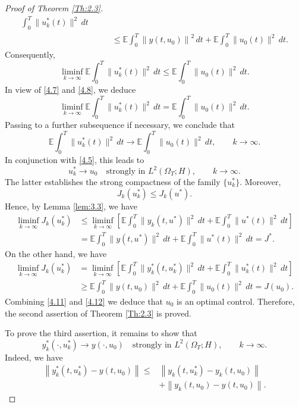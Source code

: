 \documentclass[a4paper,12pt]{article}
\numberwithin{equation}{section}
\begin{document}
\begin{proof}[Proof of Theorem \ref{Th:2.3}]
\[\begin{aligned}
\int_0^T
\|u_k^*(t)\|^2\,dt
\\
&\qquad\leq
\mathbb{E}
\int_0^T
\left\|
y(t,u_0)
\right\|^2\,dt
+
\mathbb{E}
\int_0^T
\|u_0(t)\|^2\,dt.
\end{aligned}
\]
Consequently,
\begin{equation}
\liminf_{k\to\infty}
\mathbb{E}
\int_0^T
\|u_k^*(t)\|^2\,dt
\leq
\mathbb{E}
\int_0^T
\|u_0(t)\|^2\,dt.
\label{4.8}
\end{equation}
In view of \eqref{4.7} and \eqref{4.8}, we deduce
\[
\liminf_{k\to\infty}
\mathbb{E}
\int_0^T
\|u_k^*(t)\|^2\,dt
=
\mathbb{E}
\int_0^T
\|u_0(t)\|^2\,dt.
\]
Passing to a further subsequence if necessary, we conclude that
\begin{equation}
\mathbb{E}
\int_0^T
\|u_k^*(t)\|^2\,dt
\to
\mathbb{E}
\int_0^T
\|u_0(t)\|^2\,dt,
\qquad k\to\infty.
\label{4.9}
\end{equation}
In conjunction with \eqref{4.5}, this leads to
\begin{equation}
u_k^*
\longrightarrow
u_0
\quad\text{strongly in }L^2(\Omega_T;H),
\qquad k\to\infty.
\label{4.10}
\end{equation}
The latter establishes the strong compactness of the family
$\{u_k^*\}$. Moreover,
\[
J_k(u_k^*)
\leq
J_k(u^*).
\]
Hence, by Lemma \ref{lem:3.3}, we have
\begin{align}
\liminf_{k\to\infty}J_k(u_k^*)
&\leq
\liminf_{k\to\infty}
\left[
\mathbb{E}\int_0^T
\|y_k(t,u^*)\|^2\,dt
+
\mathbb{E}\int_0^T
\|u^*(t)\|^2\,dt
\right]
\nonumber\\
&=
\mathbb{E}\int_0^T
\|y(t,u^*)\|^2\,dt
+
\mathbb{E}\int_0^T
\|u^*(t)\|^2\,dt
=
J^*.
\label{4.11}
\end{align}
On the other hand, we have
\begin{align}
\liminf_{k\to\infty}J_k(u_k^*)
&=
\liminf_{k\to\infty}
\left[
\mathbb{E}\int_0^T
\|y_k^*(t,u_k^*)\|^2\,dt
+
\mathbb{E}\int_0^T
\|u_k^*(t)\|^2\,dt
\right]
\nonumber\\
&\geq
\mathbb{E}\int_0^T
\|y(t,u_0)\|^2\,dt
+
\mathbb{E}\int_0^T
\|u_0(t)\|^2\,dt
=
J(u_0).
\label{4.12}
\end{align}
Combining \eqref{4.11} and \eqref{4.12} we deduce that $u_0$ is
an optimal control. Therefore, the second assertion of
Theorem \ref{Th:2.3} is proved.

To prove the third assertion, it remains to show that
\begin{equation}
y_k^*(\cdot,u_k^*)
\to
y(\cdot,u_0)
\quad\text{strongly in }L^2(\Omega_T;H),
\qquad k\to\infty.
\label{4.13}
\end{equation}
Indeed, we have
\begin{align}
\left\|
y_k^*(t,u_k^*)-y(t,u_0)
\right\|
\leq{}&
\left\|
y_k(t,u_k^*)-y_k(t,u_0)
\right\|
\nonumber\\
&+
\left\|
y_k(t,u_0)-y(t,u_0)
\right\|.
\label{4.14}
\end{align}


\end{proof}
\end{document}
